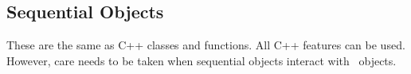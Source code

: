 \subsection{Sequential Objects}

These are the same as C++ classes and functions.  All C++ features can
be used.  However, care needs to be taken when sequential objects
interact with \charmpp\ objects.
